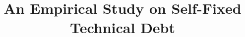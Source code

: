 \documentclass[sigconf,review]{acmart}
\begin{document}
\title{An Empirical Study on Self-Fixed Technical Debt\\}


\begin{abstract}

\end{abstract}



\maketitle



\end{document}
